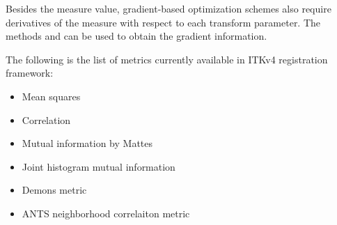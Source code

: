 Besides the measure value, gradient-based optimization schemes also require
derivatives of the measure with respect to each transform parameter. The
methods  and  can be
used to obtain the gradient information.


The following is the list of metrics currently available in ITKv4 registration framework:
\begin{itemize}
\item Mean squares\\ 
\item Correlation \\ 
\item Mutual information by Mattes \\ 
\item Joint histogram mutual information \\ 
\item Demons metric \\ 
\item ANTS neighborhood correlaiton metric \\ 
\end{itemize}


